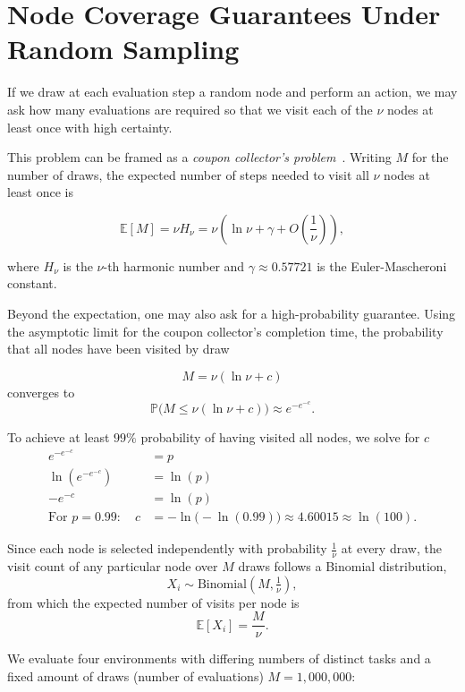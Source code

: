 \section{Node Coverage Guarantees Under Random Sampling}

If we draw at each evaluation step a random node and perform an action, we may ask how many evaluations are required so that we visit each of the \(\nu\) nodes at least once with high certainty.

This problem can be framed as a \emph{coupon collector's problem}~\cite{feller1968introduction}. Writing $M$ for the number of draws, the expected number of steps needed to visit all \(\nu\) nodes at least once is

\[
\mathbb{E}[M]
= \nu H_\nu
= \nu \left( \ln \nu + \gamma + O\!\left(\frac{1}{\nu}\right) \right),
\]

where \(H_\nu\) is the \(\nu\)-th harmonic number and \(\gamma \approx 0.57721\) is the Euler-Mascheroni constant.

\bigskip

Beyond the expectation, one may also ask for a high-probability guarantee.
Using the asymptotic limit for the coupon collector's completion time,
the probability that all nodes have been visited by draw

\[
M = \nu(\ln \nu + c)
\]
converges to
\[
\mathbb{P}\bigl(M \le \nu(\ln \nu + c)\bigr) \approx e^{-e^{-c}}.
\]

To achieve at least \(99\%\) probability of having visited all nodes, we solve for $c$
\[
\begin{aligned}
e^{-e^{-c}} &= p \\[8pt]
\ln\!\left(e^{-e^{-c}}\right) &= \ln(p) \\[8pt]
-e^{-c} &= \ln(p) \\[8pt]
\text{For } p = 0.99:\quad
c &= -\ln\!\bigl(-\ln(0.99)\bigr) \approx 4.60015 \approx \ln(100).
\end{aligned}
\]

Since each node is selected independently with probability $\tfrac{1}{\nu}$ at every draw,
the visit count of any particular node over $M$ draws follows a Binomial distribution,
\[
X_i \sim \mathrm{Binomial}\!\left(M, \tfrac{1}{\nu}\right),
\]
from which the expected number of visits per node is
\[
\mathbb{E}[X_i] = \frac{M}{\nu}.
\]


We evaluate four environments with differing numbers of distinct tasks and a fixed amount of draws (number of evaluations) $M=1{,}000{,}000$:

